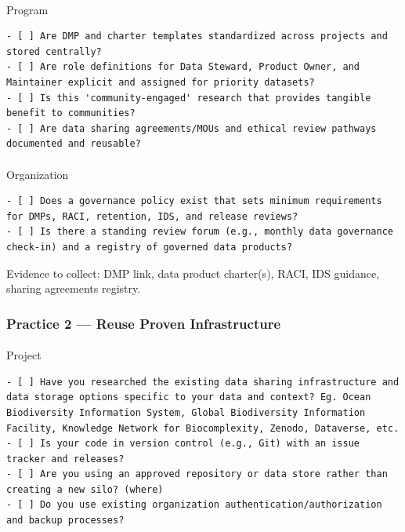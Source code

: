 \documentclass[
  letterpaper,
  DIV=11,
  numbers=noendperiod]{scrartcl}
\makeatletter
\let\oldparagraph\paragraph
\renewcommand{\paragraph}{
    \@ifstar
      \xxxParagraphStar
      \xxxParagraphNoStar
  }
\newcommand{\xxxParagraphStar}[1]{\oldparagraph*{#1}\mbox{}}
\newcommand{\xxxParagraphNoStar}[1]{\oldparagraph{#1}\mbox{}}
\makeatother
\begin{document}
\paragraph{Program}\label{program}

\begin{verbatim}
- [ ] Are DMP and charter templates standardized across projects and stored centrally?
- [ ] Are role definitions for Data Steward, Product Owner, and Maintainer explicit and assigned for priority datasets?
- [ ] Is this 'community-engaged' research that provides tangible benefit to communities?
- [ ] Are data sharing agreements/MOUs and ethical review pathways documented and reusable?
\end{verbatim}

\paragraph{Organization}\label{organization}

\begin{verbatim}
- [ ] Does a governance policy exist that sets minimum requirements for DMPs, RACI, retention, IDS, and release reviews?
- [ ] Is there a standing review forum (e.g., monthly data governance check‑in) and a registry of governed data products?
\end{verbatim}

Evidence to collect: DMP link, data product charter(s), RACI, IDS
guidance, sharing agreements registry.

\subsubsection{Practice 2 --- Reuse Proven
Infrastructure}\label{practice-2-reuse-proven-infrastructure}

\paragraph{Project}\label{project-1}

\begin{verbatim}
- [ ] Have you researched the existing data sharing infrastructure and data storage options specific to your data and context? Eg. Ocean Biodiversity Information System, Global Biodiversity Information Facility, Knowledge Network for Biocomplexity, Zenodo, Dataverse, etc.
- [ ] Is your code in version control (e.g., Git) with an issue tracker and releases?
- [ ] Are you using an approved repository or data store rather than creating a new silo? (where)
- [ ] Do you use existing organization authentication/authorization and backup processes?
\end{verbatim}
\end{document}
